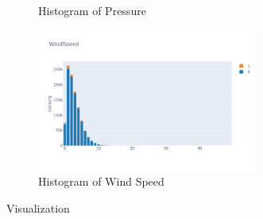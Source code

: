 \documentclass[10pt]{article}
\begin{document}
\begin{figure}[H]
\begin{subfigure}[t]{0.48\textwidth}
        \caption{Histogram of Pressure}
    \end{subfigure}
    \begin{subfigure}[t]{0.48\textwidth}
        \centering
        \includegraphics[width=0.8\textwidth]{../res/eda5.png}
        \caption{Histogram of Wind Speed}
    \end{subfigure}
    \caption{Visualization}
\end{figure}
\end{document}
